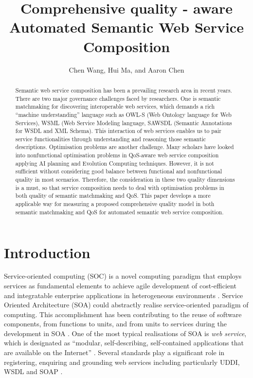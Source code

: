\documentclass{llncs}
\title{Comprehensive quality - aware Automated Semantic Web Service Composition}
\author{Chen Wang, Hui Ma, and Aaron Chen}
\institute{School of Engineering and Computer Science,
\\Victoria University of Wellington, New Zealand \\
\email{\{Chen.Wang, Hui.Ma, and Aaron.Chen\}@ecs.vuw.ac.nz }}
\begin{document}
\maketitle

\begin{abstract}
Semantic web service composition has been a prevailing research area in recent years. There are two major governance challenges faced by researchers. One is semantic matchmaking for discovering interoperable web services, which demands a rich “machine understanding” language such as OWL-S (Web Ontology language for Web Services), WSML (Web Service Modeling language, SAWSDL (Semantic Annotations for WSDL and XML Schema). This interaction of web services enables us to pair service functionalities through understanding and reasoning those semantic descriptions. Optimisation problems are another challenge. Many scholars have looked into nonfunctional optimisation problems in QoS-aware web service composition applying AI planning and Evolution Computing techniques. However, it is not sufficient without considering good balance between functional and nonfunctional quality in most scenarios. Therefore, the consideration in these two quality dimensions is a must, so that service composition needs to deal with optimisation problems in both quality of semantic matchmaking and QoS. This paper develops a more applicable way for measuring a proposed comprehensive quality model in both semantic matchmaking and QoS for automated semantic web service composition.
\end{abstract}

\section{Introduction}\label{introduction}
Service-oriented computing (SOC) is a novel computing paradigm that employs services as fundamental elements to achieve agile development of cost-efficient and integratable enterprise applications in heterogeneous environments \cite{papazoglou2003service}. Service Oriented Architecture (SOA) could abstractly realise service-oriented paradigm of computing. This accomplishment has been contributing to the reuse of software components, from functions to units, and from units to services during the development in SOA \cite{booth2004web}. One of the most typical realisations of SOA is \textit{web service}, which is designated as ``modular, self-describing, self-contained applications that are available on the Internet'' \cite{curbera2001web}. Several standards play a significant role in registering, enquiring and grounding web services including particularly UDDI, WSDL and SOAP \cite{fensel2011semantic}.
\end{document}
